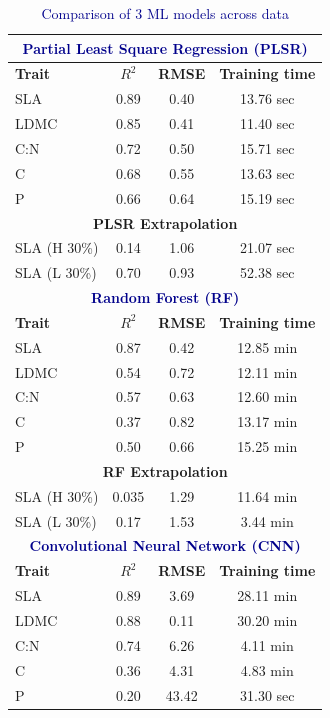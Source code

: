 \documentclass[12pt,a4paper]{report}
\begin{document}
\begin{table}[h!]
\centering
\caption{\textcolor{darkblue}{Comparison of 3 ML models across data}}
\label{tab:main-sub-table}
\begin{tabular}{lccc}
\toprule
\multicolumn{4}{c}{\textbf{\textcolor{darkblue}{Partial Least Square Regression (PLSR)}}} \\ 
\midrule
\textbf{Trait} & \textbf{$R^2$} & \textbf{RMSE} & \textbf{Training time} \\
\midrule
SLA  & 0.89 & 0.40 & 13.76 sec \\
LDMC & 0.85 & 0.41 & 11.40 sec \\
C:N  & 0.72 & 0.50 & 15.71 sec \\
C    & 0.68 & 0.55 & 13.63 sec \\
P    & 0.66 & 0.64 & 15.19 sec \\
\midrule
\multicolumn{4}{c}{\textbf{{PLSR Extrapolation}}} \\ 
\midrule
SLA (H 30\%) & 0.14 & 1.06 &  21.07 sec \\
SLA  (L 30\%)& 0.70 & 0.93 &  52.38 sec \\
\midrule
\multicolumn{4}{c}{\textbf{\textcolor{darkblue}{Random Forest (RF)}}} \\ 
\midrule
\textbf{Trait} & \textbf{$R^2$} & \textbf{RMSE} & \textbf{Training time} \\
\midrule
SLA  & 0.87 & 0.42 & 12.85 min \\
LDMC & 0.54 & 0.72 & 12.11 min \\
C:N  & 0.57 & 0.63 & 12.60 min \\
C    & 0.37 & 0.82 & 13.17 min \\
P    & 0.50 & 0.66 & 15.25 min \\
\midrule
\multicolumn{4}{c}{\textbf{{RF Extrapolation}}} \\ 
\midrule
SLA (H 30\%) & 0.035 & 1.29 &  11.64 min \\
SLA  (L 30\%)& 0.17 & 1.53 & 3.44 min \\
\midrule
\multicolumn{4}{c}{\textbf{\textcolor{darkblue}{Convolutional Neural Network (CNN)}}} \\
\midrule
\textbf{Trait} & \textbf{$R^2$} & \textbf{RMSE} & \textbf{Training time} \\
\midrule
SLA  & 0.89 & 3.69 & 28.11 min \\
LDMC & 0.88 & 0.11 & 30.20 min \\
C:N  & 0.74 & 6.26 & 4.11 min \\
C    & 0.36 & 4.31 & 4.83 min \\
P    & 0.20 & 43.42 & 31.30 sec \\
\bottomrule
\end{tabular}
\end{table}
\end{document}
